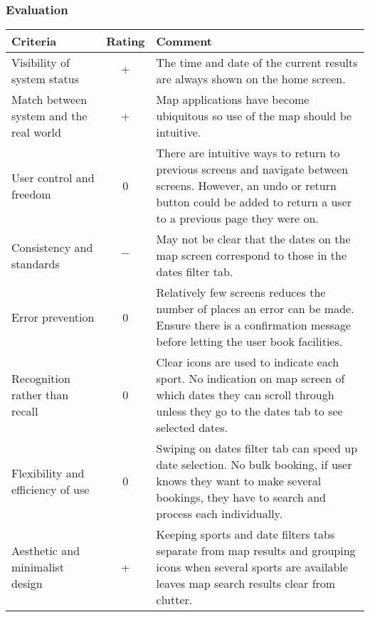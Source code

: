 \subsubsection{Evaluation}

\begin{center}
	\renewcommand{\arraystretch}{2}
	\begin{longtable}{p{} c p{}}
		\toprule
		\textbf{Criteria} & \textbf{Rating} & \textbf{Comment}\\
		\midrule
		Visibility of system status & $+$ & The time and date of the current
		results are always shown on the home screen.\\

		Match between system and the real world & + & Map applications have
		become ubiquitous so use of the map should be intuitive.\\

		User control and freedom & 0 & There are intuitive ways to return to
		previous screens and navigate between screens. However, an undo or
		return button could be added to return a user to a previous page they
		were on.\\

		Consistency and standards & $-$ & May not be clear that the dates on
		the map screen correspond to those in the dates filter tab.\\

		Error prevention & 0 & Relatively few screens reduces the number of
		places an error can be made. Ensure there is a confirmation message
		before letting the user book facilities.\\

		Recognition rather than recall & 0 & Clear icons are used to indicate
		each sport. No indication on map screen of which dates they can scroll
		through unless they go to the dates tab to see selected dates.\\

		Flexibility and efficiency of use & 0 & Swiping on dates filter tab can
		speed up date selection. No bulk booking, if user knows they want to
		make several bookings, they have to search and process each
		individually. \\

		Aesthetic and minimalist design & + & Keeping sports and date filters
		tabs separate from map results and grouping icons when several sports
		are available leaves map search results clear from clutter.\\


\end{longtable}
\end{center}
